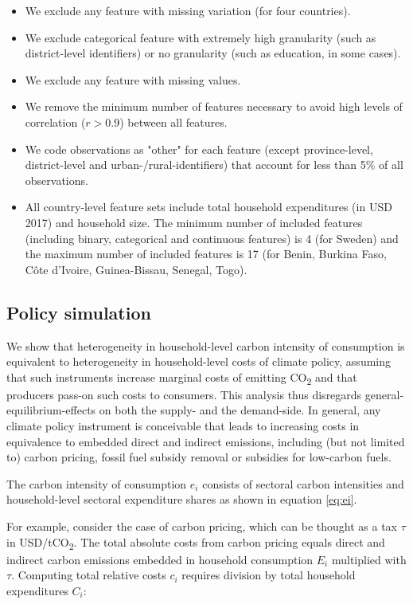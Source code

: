 \documentclass[12pt, a4paper]{article}
\begin{document}
\begin{refsection}
\begin{itemize}
    \item We exclude any feature with missing variation (for four countries).
    \item We exclude categorical feature with extremely high granularity (such as district-level identifiers) or no granularity (such as education, in some cases).
    \item We exclude any feature with missing values.
    \item We remove the minimum number of features necessary to avoid high levels of correlation ($r>0.9$) between all features.
    \item We code observations as "other" for each feature (except province-level, district-level and urban-/rural-identifiers) that account for less than 5\% of all observations.
    \item All country-level feature sets include total household expenditures (in USD 2017) and household size. The minimum number of included features (including binary, categorical and continuous features) is 4 (for Sweden) and the maximum number of included features is 17 (for Benin, Burkina Faso, Côte d'Ivoire, Guinea-Bissau, Senegal, Togo).
\end{itemize}

\subsection{Policy simulation}\label{sec:policysimulation}

We show that heterogeneity in household-level carbon intensity of consumption is equivalent to heterogeneity in household-level costs of climate policy, assuming that such instruments increase marginal costs of emitting CO\textsubscript{2} and that producers pass-on such costs to consumers. This analysis thus disregards general-equilibrium-effects on both the supply- and the demand-side. In general, any climate policy instrument is conceivable that leads to increasing costs in equivalence to embedded direct and indirect emissions, including (but not limited to) carbon pricing, fossil fuel subsidy removal or subsidies for low-carbon fuels.

The carbon intensity of consumption $e_{i}$ consists of sectoral carbon intensities and household-level sectoral expenditure shares as shown in equation \ref{eq:ei}. 

For example, consider the case of carbon pricing, which can be thought as a tax $\tau$ in USD/tCO\textsubscript{2}. The total absolute costs from carbon pricing equals direct and indirect carbon emissions embedded in household consumption $E_{i}$ multiplied with $\tau$. Computing total relative costs $c_{i}$ requires division by total household expenditures $C_{i}$:


\end{refsection}
\end{document}
